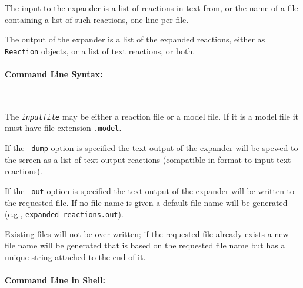 The input to the expander is a list of reactions in text from, or the name of a file containing a list of such reactions, one line per file.

The output of the expander is a list of the expanded reactions, either as {\tt Reaction} objects, or a list of text reactions, or both. 


\paragraph{Command Line Syntax:}\ 


The {\tt \textit{inputfile}} may be either a reaction file or a model file. If it is a model file it must have file extension {\tt .model}. 

If the {\tt -dump} option is specified the text output of the expander will be spewed to the screen as a list
of text output reactions (compatible in format to input text reactions). 

If the {\tt -out} option is specified the text output of the expander will be written to the requested file. If no
file name is given a default file name will be generated (e.g., {\tt expanded-reactions.out}). 

Existing files will not be over-written; if the requested file already exists a new file name will be generated that is based on the requested file name but has a unique string attached to the end of it.



\paragraph{Command Line in Shell:}\ \\




